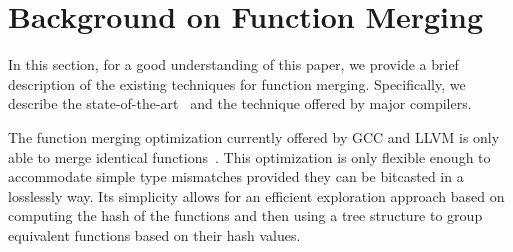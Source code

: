 \vspace{-2ex}
\section{Background on Function Merging} \label{sec:background}

In this section, for a good understanding of this paper, we provide a brief 
description of the existing techniques for function merging.
Specifically, we describe the state-of-the-art~\cite{edler14} and the
technique offered by major compilers.

The function merging optimization currently offered by GCC and LLVM is
only able to merge identical functions~\cite{llvm-fm,livska14}.
This optimization is only flexible enough to accommodate simple type mismatches
provided they can be bitcasted in a losslessly way.
Its simplicity allows for an efficient exploration approach based on computing
the hash of the functions and then using a tree structure to group equivalent
functions based on their hash values.

